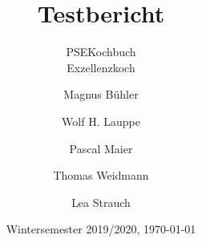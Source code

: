 \documentclass[a4paper,openany,parskip=full]{scrreprt}
\begin{document}
	\title{
		\huge{Testbericht}
	}
	\subtitle{
		\vspace{1cm}
		\Large {PSEKochbuch}\\
		\LARGE{Exzellenzkoch}
		\vspace{2cm}
	}
	\date{
		\vspace{3cm}
		Wintersemester 2019/2020, \today \\
		\vspace{1cm}
		\vspace{1cm}
	}
	\author{
		Magnus Bühler
		\and Wolf H. Lauppe
		\and Pascal Maier
		\and Thomas Weidmann
		\and Lea Strauch
	}
	\maketitle

\newpage
{}
\tableofcontents
\newpage
{}









\end{document}
